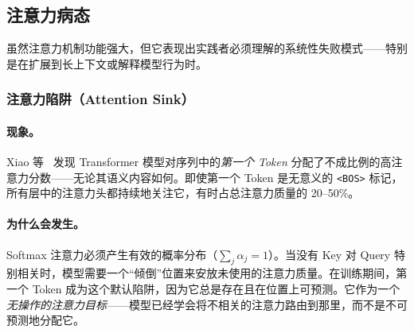 \subsection{注意力病态}
\label{attention-pathologies}

虽然注意力机制功能强大，但它表现出实践者必须理解的系统性失败模式——特别是在扩展到长上下文或解释模型行为时。

\subsubsection{注意力陷阱（Attention Sink）}
\label{attention-sink}

\paragraph{现象。}
\label{the-phenomenon.}

Xiao 等~\cite{xiao2024efficient} 发现 Transformer 模型对序列中的\emph{第一个 Token} 分配了不成比例的高注意力分数——无论其语义内容如何。即使第一个 Token 是无意义的 \texttt{<BOS>} 标记，所有层中的注意力头都持续地关注它，有时占总注意力质量的 20--50\%。

\paragraph{为什么会发生。}
\label{why-it-happens.}

Softmax 注意力必须产生有效的概率分布（$\sum_j \alpha_j = 1$）。当没有 Key 对 Query 特别相关时，模型需要一个``倾倒''位置来安放未使用的注意力质量。在训练期间，第一个 Token 成为这个默认陷阱，因为它总是存在且在位置上可预测。它作为一个\emph{无操作的注意力目标}——模型已经学会将不相关的注意力路由到那里，而不是不可预测地分配它。

